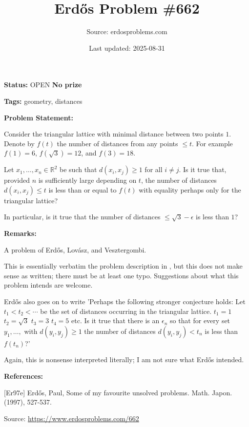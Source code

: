 \documentclass{article}
\title{Erd\H{o}s Problem \#662}
\date{Last updated: 2025-08-31}
\author{Source: erdosproblems.com}
\begin{document}
\maketitle

\noindent\textbf{Status:} OPEN \quad \textbf{No prize}

\noindent\textbf{Tags:} geometry, distances

\medskip
\noindent\textbf{Problem Statement:}

Consider the triangular lattice with minimal distance between two points $1$. Denote by $f(t)$ the number of distances from any points $\leq t$. For example $f(1)=6$, $f(\sqrt{3})=12$, and $f(3)=18$.

Let $x_1,\ldots,x_n\in \mathbb{R}^2$ be such that $d(x_i,x_j)\geq 1$ for all $i\neq j$. Is it true that, provided $n$ is sufficiently large depending on $t$, the number of distances $d(x_i,x_j)\leq t$ is less than or equal to $f(t)$ with equality perhaps only for the triangular lattice?

In particular, is it true that the number of distances $\leq \sqrt{3}-\epsilon$ is less than $1$?

\bigskip
\noindent\textbf{Remarks:}

A problem of Erd\H{o}s, Lov\'{a}sz, and Vesztergombi.

This is essentially verbatim the problem description in \cite{Er97e}, but this does not make sense as written; there must be at least one typo. Suggestions about what this problem intends are welcome.

Erd\H{o}s also goes on to write 'Perhaps the following stronger conjecture holds: Let $t_1<t_2<\cdots$ be the set of distances occurring in the triangular lattice. $t_1=1$ $t_2=\sqrt{3}$ $t_3=3$ $t_4=5$ etc. Is it true that there is an $\epsilon_n$ so that for every set $y_1,\ldots,$ with $d(y_i,y_j)\geq 1$ the number of distances $d(y_i,y_j)<t_n$ is less than $f(t_n)$?'

Again, this is nonsense interpreted literally; I am not sure what Erd\H{o}s intended.

\bigskip
\noindent\textbf{References:}

[Er97e] Erd\H{o}s, Paul, Some of my favourite unsolved problems. Math. Japon. (1997), 527-537.

\bigskip
\noindent\small{Source: \url{https://www.erdosproblems.com/662}}
\end{document}
